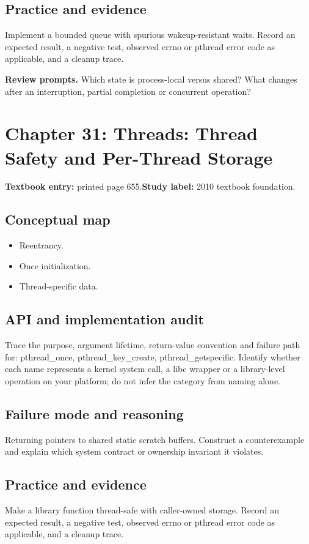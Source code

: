 \documentclass[11pt,letterpaper,oneside]{report}
\begin{document}
\subsection{Practice and evidence}
Implement a bounded queue with spurious wakeup-resistant waits. Record an expected result, a negative test, observed errno or pthread error code as applicable, and a cleanup trace.

\textbf{Review prompts.} Which state is process-local versus shared? What changes after an interruption, partial completion or concurrent operation?

\section{Chapter 31: Threads: Thread Safety and Per-Thread Storage}
\textbf{Textbook entry:} printed page 655.\quad \textbf{Study label:} 2010 textbook foundation.

\subsection{Conceptual map}
\begin{itemize}
\item Reentrancy.
\item Once initialization.
\item Thread-specific data.
\end{itemize}
\subsection{API and implementation audit}
Trace the purpose, argument lifetime, return-value convention and failure path for: pthread\_once, pthread\_key\_create, pthread\_getspecific. Identify whether each name represents a kernel system call, a libc wrapper or a library-level operation on your platform; do not infer the category from naming alone.

\subsection{Failure mode and reasoning}
Returning pointers to shared static scratch buffers. Construct a counterexample and explain which system contract or ownership invariant it violates.

\subsection{Practice and evidence}
Make a library function thread-safe with caller-owned storage. Record an expected result, a negative test, observed errno or pthread error code as applicable, and a cleanup trace.
\end{document}
